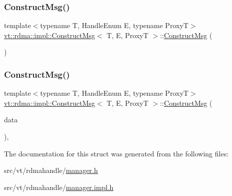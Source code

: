 \subsubsection{\texorpdfstring{Construct\+Msg()}{ConstructMsg()}\hspace{0.1cm}{\footnotesize\ttfamily [1/2]}}
{\footnotesize\ttfamily template$<$typename T, Handle\+Enum E, typename ProxyT$>$ \\
\hyperlink{structvt_1_1rdma_1_1impl_1_1_construct_msg}{vt\+::rdma\+::impl\+::\+Construct\+Msg}$<$ T, E, ProxyT $>$\+::\hyperlink{structvt_1_1rdma_1_1impl_1_1_construct_msg}{Construct\+Msg} (\begin{DoxyParamCaption}{ }\end{DoxyParamCaption})\hspace{0.3cm}{\ttfamily [default]}}

\mbox{\label{structvt_1_1rdma_1_1impl_1_1_construct_msg_ad09c61f7e1cb33be9631a2e4885f9cfa}} 
\subsubsection{\texorpdfstring{Construct\+Msg()}{ConstructMsg()}\hspace{0.1cm}{\footnotesize\ttfamily [2/2]}}
{\footnotesize\ttfamily template$<$typename T, Handle\+Enum E, typename ProxyT$>$ \\
\hyperlink{structvt_1_1rdma_1_1impl_1_1_construct_msg}{vt\+::rdma\+::impl\+::\+Construct\+Msg}$<$ T, E, ProxyT $>$\+::\hyperlink{structvt_1_1rdma_1_1impl_1_1_construct_msg}{Construct\+Msg} (\begin{DoxyParamCaption}\item[{\hyperlink{structvt_1_1rdma_1_1impl_1_1_handle_data}{Handle\+Data} \&\&}]{data }\end{DoxyParamCaption})\hspace{0.3cm}{\ttfamily [inline]}, {\ttfamily [explicit]}}



The documentation for this struct was generated from the following files\+:\begin{DoxyCompactItemize}
\item 
src/vt/rdmahandle/\hyperlink{rdmahandle_2manager_8h}{manager.\+h}\item 
src/vt/rdmahandle/\hyperlink{rdmahandle_2manager_8impl_8h}{manager.\+impl.\+h}\end{DoxyCompactItemize}

